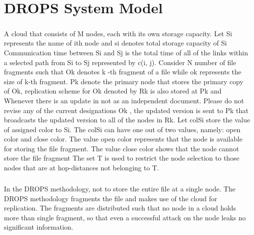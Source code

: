 \chapter{ DROPS System Model}
\paragraph{}
A cloud that consists of M nodes, each with its own storage capacity. Let Si represents
the name of ith node and si denotes total storage capacity of Si Communication time
between Si and Sj is the total time of all of the links within a selected path from Si to Sj
represented by c(i, j). Consider N number of file fragments such that Ok denotes k -th
fragment of a file while ok represents the size of k-th fragment. Pk denote the primary
node that stores the primary copy of Ok, replication scheme for Ok denoted by Rk is also
stored at Pk and Whenever there is an update in not as an independent document. Please
do not revise any of the current designations Ok , the updated version is sent to Pk that
broadcasts the updated version to all of the nodes in Rk. Let colSi store the value of
assigned color to Si. The colSi can have one out of two values, namely: open color and
close color. The value open color represents that the node is available for storing the file
fragment. The value close color shows that the node cannot store the file fragment The
set T is used to restrict the node selection to those nodes that are at hop-distances not
belonging to T.
\paragraph*{}
In the DROPS methodology, not to store the entire file at a single node. The DROPS
methodology fragments the file and makes use of the cloud for replication. The fragments
are distributed such that no node in a cloud holds more than single fragment, so that even
a successful attack on the node leaks no significant information.

